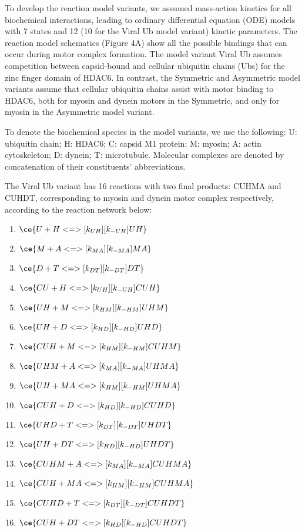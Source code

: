 To develop the reaction model variants, we assumed mass-action kinetics for all biochemical interactions, leading to ordinary differential equation (ODE) models with 7 states and 12 (10 for the Viral Ub model variant) kinetic parameters. The reaction model schematics (Figure 4A) show all the possible bindings that can occur during motor complex formation. The model variant Viral Ub assumes competition between capsid-bound and cellular ubiquitin chains (Ubs) for the zinc finger domain of HDAC6. In contrast, the Symmetric and Asymmetric model variants assume that cellular ubiquitin chains assist with motor binding to HDAC6, both for myosin and dynein motors in the Symmetric, and only for myosin in the Asymmetric model variant.

To denote the biochemical species in the model variants, we use the following: U: ubiquitin chain; H: HDAC6; C: capsid M1 protein; M: myosin; A: actin cytoskeleton; D: dynein; T: microtubule. Molecular complexes are denoted by concatenation of their constituents’ abbreviations.

The Viral Ub variant has 16 reactions with two final products: CUHMA and CUHDT, corresponding to myosin and dynein motor complex respectively, according to the reaction network below:

\begin{enumerate}
\item $\ce{U + H <=>[k_{UH}][k_{-UH}] UH}$ %
\item $\ce{M + A <=>[k_{MA}][k_{-MA}] MA}$ %
\item $\ce{D + T <=>[k_{DT}][k_{-DT}] DT}$ %

\item $\ce{CU + H <=>[k_{UH}][k_{-UH}] CUH}$ %
\item $\ce{UH + M <=>[k_{HM}][k_{-HM}] UHM}$ %
\item $\ce{UH + D <=>[k_{HD}][k_{-HD}] UHD}$ %

\item $\ce{CUH + M <=>[k_{HM}][k_{-HM}] CUHM}$ %
\item $\ce{UHM + A <=>[k_{MA}][k_{-MA}] UHMA}$ %
\item $\ce{UH + MA <=>[k_{HM}][k_{-HM}] UHMA}$ %
\item $\ce{CUH + D <=>[k_{HD}][k_{-HD}] CUHD}$ %
\item $\ce{UHD + T <=>[k_{DT}][k_{-DT}] UHDT}$ %
\item $\ce{UH + DT <=>[k_{HD}][k_{-HD}] UHDT}$ %

\item $\ce{CUHM + A <=>[k_{MA}][k_{-MA}] CUHMA}$ %
\item $\ce{CUH + MA <=>[k_{HM}][k_{-HM}] CUHMA}$ %
\item $\ce{CUHD + T <=>[k_{DT}][k_{-DT}] CUHDT}$ %
\item $\ce{CUH + DT <=>[k_{HD}][k_{-HD}] CUHDT}$ %
\end{enumerate}

